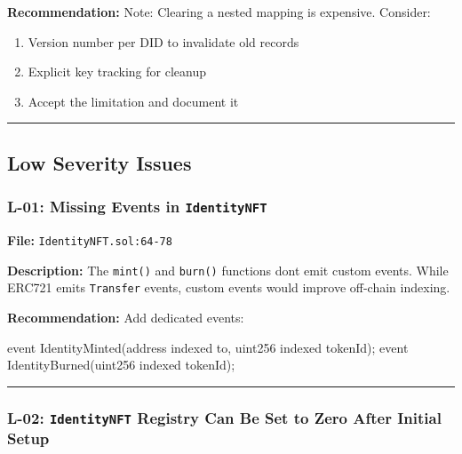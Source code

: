 \documentclass[
]{article}
\newenvironment{Shaded}{}{}
\newcommand{\NormalTok}[1]{#1}
\providecommand{\tightlist}{%
  \setlength{\itemsep}{0pt}\setlength{\parskip}{0pt}}
\begin{document}
\textbf{Recommendation:} Note: Clearing a nested mapping is expensive.
Consider:

\begin{enumerate}
\def\labelenumi{\arabic{enumi}.}
\tightlist
\item
  Version number per DID to invalidate old records
\item
  Explicit key tracking for cleanup
\item
  Accept the limitation and document it
\end{enumerate}

\begin{center}\rule{0.5\linewidth}{0.5pt}\end{center}

\subsection{Low Severity Issues}\label{low-severity-issues}

\subsubsection{\texorpdfstring{L-01: Missing Events in
\texttt{IdentityNFT}}{L-01: Missing Events in IdentityNFT}}\label{l-01-missing-events-in-identitynft}

\textbf{File:} \texttt{IdentityNFT.sol:64-78}

\textbf{Description:} The \texttt{mint()} and \texttt{burn()} functions
don\textquotesingle t emit custom events. While ERC721 emits
\texttt{Transfer} events, custom events would improve off-chain
indexing.

\textbf{Recommendation:} Add dedicated events:

\begin{Shaded}
\begin{Highlighting}[]
\NormalTok{event IdentityMinted(address indexed to, uint256 indexed tokenId);}
\NormalTok{event IdentityBurned(uint256 indexed tokenId);}
\end{Highlighting}
\end{Shaded}

\begin{center}\rule{0.5\linewidth}{0.5pt}\end{center}

\subsubsection{\texorpdfstring{L-02: \texttt{IdentityNFT} Registry Can
Be Set to Zero After Initial
Setup}{L-02: IdentityNFT Registry Can Be Set to Zero After Initial Setup}}\label{l-02-identitynft-registry-can-be-set-to-zero-after-initial-setup}
\end{document}
